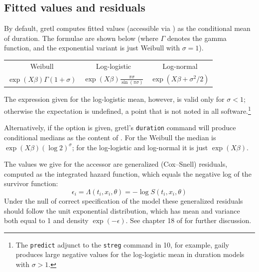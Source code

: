 \subsection{Fitted values and residuals}

By default, gretl computes fitted values (accessible via
) as the conditional mean of duration.  The formulae
are shown below (where $\Gamma$ denotes the gamma function, and the
exponential variant is just Weibull with $\sigma = 1$).

\begin{center}
\setlength\tabcolsep{1em}
\begin{tabular}{ccc}
Weibull & Log-logistic & Log-normal \\ [4pt]
$\exp(X\beta)\Gamma(1 + \sigma)$ &
$\displaystyle \exp(X\beta)\frac{\pi \sigma}{\sin(\pi \sigma)}$ &
$\exp(X\beta + \sigma^2/2)$
\end{tabular}
\end{center}

The expression given for the log-logistic mean, however, is valid only
for $\sigma < 1$; otherwise the expectation is undefined, a point that
is not noted in all software.\footnote{The \texttt{predict} adjunct to
  the \texttt{streg} command in  10, for example, gaily
  produces large negative values for the log-logistic mean in duration
  models with $\sigma > 1$.}

Alternatively, if the  option is given, gretl's
\texttt{duration} command will produce conditional medians as the
content of .  For the Weibull the median is
$\exp(X\beta)(\log 2)^\sigma$; for the log-logistic and log-normal it
is just $\exp(X\beta)$.

The values we give for the accessor  are generalized
(Cox--Snell) residuals, computed as the integrated hazard function,
which equals the negative log of the survivor function:
\[
\epsilon_i = \Lambda(t_i, x_i, \theta) = -\log S(t_i, x_i, \theta)
\]
Under the null of correct specification of the model these generalized
residuals should follow the unit exponential distribution, which has
mean and variance both equal to 1 and density $\exp(-\epsilon)$. See
chapter 18 of \cite{cameron-trivedi05} for further discussion.

